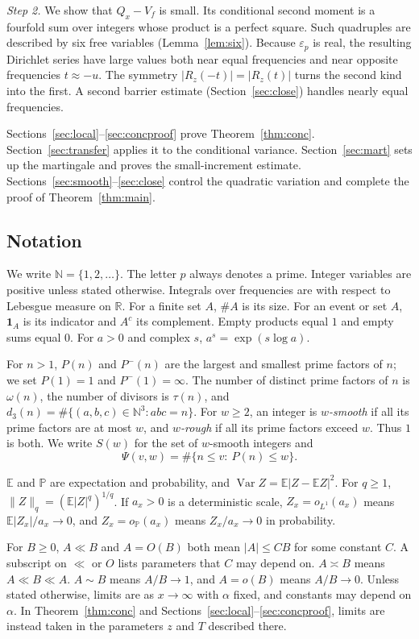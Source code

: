 \documentclass[11pt]{amsart}
\theoremstyle{remark}
\numberwithin{equation}{section}
\newcommand{\E}{\mathbb{E}}
\renewcommand{\P}{\mathbb{P}}
\newcommand{\R}{\mathbb{R}}
\newcommand{\N}{\mathbb{N}}
\newcommand{\one}{\mathbf{1}}
\newcommand{\Var}{\operatorname{Var}}
\begin{document}
\emph{Step 2.} We show that $Q_x-V_f$ is small. Its conditional second moment is a fourfold sum over integers whose product is a perfect square. Such quadruples are described by six free variables (Lemma~\ref{lem:six}). Because $\varepsilon_p$ is real, the resulting Dirichlet series have large values both near equal frequencies and near opposite frequencies $t\approx-u$. The symmetry $|R_z(-t)|=|R_z(t)|$ turns the second kind into the first. A second barrier estimate (Section~\ref{sec:close}) handles nearly equal frequencies.

Sections~\ref{sec:local}--\ref{sec:concproof} prove Theorem~\ref{thm:conc}. Section~\ref{sec:transfer} applies it to the conditional variance. Section~\ref{sec:mart} sets up the martingale and proves the small-increment estimate. Sections~\ref{sec:smooth}--\ref{sec:close} control the quadratic variation and complete the proof of Theorem~\ref{thm:main}.

\subsection{Notation}\label{sec:notation}
We write $\N=\{1,2,\dots\}$. The letter $p$ always denotes a prime. Integer variables are positive unless stated otherwise. Integrals over frequencies are with respect to Lebesgue measure on $\R$. For a finite set $A$, $\#A$ is its size. For an event or set $A$, $\one_A$ is its indicator and $A^c$ its complement. Empty products equal $1$ and empty sums equal $0$. For $a>0$ and complex $s$, $a^s=\exp(s\log a)$.

For $n>1$, $P(n)$ and $P^-(n)$ are the largest and smallest prime factors of $n$; we set $P(1)=1$ and $P^-(1)=\infty$. The number of distinct prime factors of $n$ is $\omega(n)$, the number of divisors is $\tau(n)$, and $d_3(n)=\#\{(a,b,c)\in\N^3:abc=n\}$. For $w\ge2$, an integer is \emph{$w$-smooth} if all its prime factors are at most $w$, and \emph{$w$-rough} if all its prime factors exceed $w$. Thus $1$ is both. We write $S(w)$ for the set of $w$-smooth integers and
\[
\Psi(v,w)=\#\{n\le v:\ P(n)\le w\}.
\]

$\E$ and $\P$ are expectation and probability, and $\Var Z=\E|Z-\E Z|^2$. For $q\ge1$, $\|Z\|_q=(\E|Z|^q)^{1/q}$. If $a_x>0$ is a deterministic scale, $Z_x=o_{L^1}(a_x)$ means $\E|Z_x|/a_x\to0$, and $Z_x=o_\P(a_x)$ means $Z_x/a_x\to0$ in probability.

For $B\ge0$, $A\ll B$ and $A=O(B)$ both mean $|A|\le CB$ for some constant $C$. A subscript on $\ll$ or $O$ lists parameters that $C$ may depend on. $A\asymp B$ means $A\ll B\ll A$. $A\sim B$ means $A/B\to1$, and $A=o(B)$ means $A/B\to0$. Unless stated otherwise, limits are as $x\to\infty$ with $\alpha$ fixed, and constants may depend on $\alpha$. In Theorem~\ref{thm:conc} and Sections~\ref{sec:local}--\ref{sec:concproof}, limits are instead taken in the parameters $z$ and $T$ described there.
\end{document}
